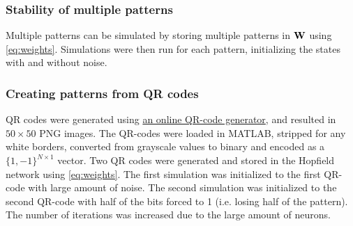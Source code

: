 \subsubsection*{Stability of multiple patterns}
Multiple patterns can be simulated by storing multiple patterns in $\bf W$ using \cref{eq:weights}. Simulations were then run for each pattern, initializing the states with and without noise.

\subsubsection*{Creating patterns from QR codes}
QR codes were generated using \href{https://miniwebtool.com/qr-code-generator/}{an online QR-code generator}, and resulted in $50 \times 50$ PNG images. The QR-codes were loaded in MATLAB, stripped for any white borders, converted from grayscale values to binary and encoded as a $\{1, -1\}^{N \times 1}$ vector. Two QR codes were generated and stored in the Hopfield network using \cref{eq:weights}. The first simulation was initialized to the first QR-code with large amount of noise. The second simulation was initialized to the second QR-code with half of the bits forced to 1 (i.e. losing half of the pattern). The number of iterations was increased due to the large amount of neurons.





